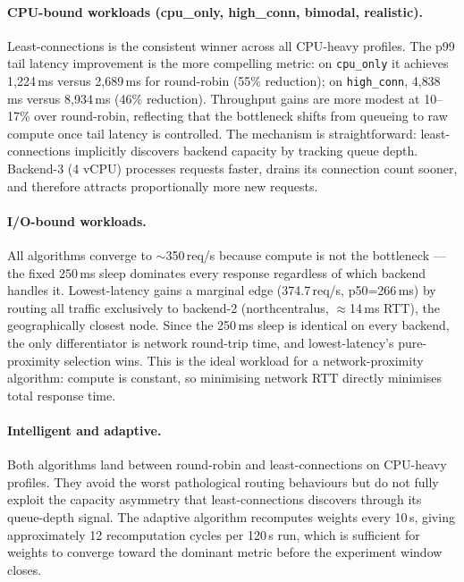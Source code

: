 \documentclass[12pt]{article}
\begin{document}
\paragraph{CPU-bound workloads (cpu\_only, high\_conn, bimodal, realistic).}
Least-connections is the consistent winner across all CPU-heavy profiles. The
p99 tail latency improvement is the more compelling metric: on \texttt{cpu\_only}
it achieves 1{,}224\,ms versus 2{,}689\,ms for round-robin (55\% reduction);
on \texttt{high\_conn}, 4{,}838\,ms versus 8{,}934\,ms (46\% reduction).
Throughput gains are more modest at 10--17\% over round-robin, reflecting that
the bottleneck shifts from queueing to raw compute once tail latency is
controlled. The mechanism is straightforward: least-connections implicitly
discovers backend capacity by tracking queue depth. Backend-3 (4 vCPU)
processes requests faster, drains its connection count sooner, and therefore
attracts proportionally more new requests.

\paragraph{I/O-bound workloads.}
All algorithms converge to $\sim$350\,req/s because compute is not the
bottleneck --- the fixed 250\,ms sleep dominates every response regardless of
which backend handles it. Lowest-latency gains a marginal edge (374.7\,req/s,
p50=266\,ms) by routing all traffic exclusively to backend-2 (northcentralus,
$\approx$14\,ms RTT), the geographically closest node. Since the 250\,ms
sleep is identical on every backend, the only differentiator is network
round-trip time, and lowest-latency's pure-proximity selection wins.
This is the ideal workload for a network-proximity algorithm: compute is
constant, so minimising network RTT directly minimises total response time.

\paragraph{Intelligent and adaptive.}
Both algorithms land between round-robin and least-connections on CPU-heavy
profiles. They avoid the worst pathological routing behaviours but do not fully
exploit the capacity asymmetry that least-connections discovers through its
queue-depth signal. The adaptive algorithm recomputes weights every 10\,s,
giving approximately 12 recomputation cycles per 120\,s run, which is
sufficient for weights to converge toward the dominant metric before the
experiment window closes.
\end{document}
